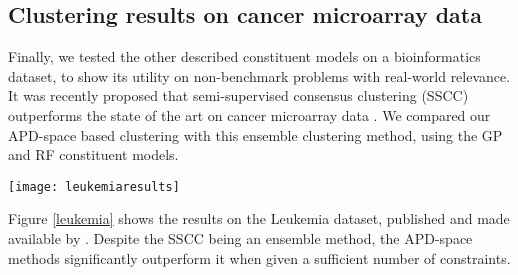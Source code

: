 
\subsection*{Clustering results on cancer microarray data}

Finally, we tested the other described constituent models on a bioinformatics dataset, to show its utility on non-benchmark problems with real-world relevance. It was recently proposed that semi-supervised consensus clustering (SSCC) outperforms the state of the art on cancer microarray data \citep{wang2014semi}. We compared our APD-space based clustering with this ensemble clustering method, using the GP and RF constituent models. 

\begin{figure*}[h]
	\centering
	\texttt{[image: leukemiaresults]}
	
	\caption[Semi-supervised clustering results on cancer microarray data]{\textbf{Semi-supervised clustering results on cancer microarray data} from \citep{golub1999molecular}, compared to the state of the art semi-supervised consensus clustering method by \citep{wang2014semi}.}
	\label{leukemia}
\end{figure*}

Figure \ref{leukemia} shows the results on the Leukemia dataset, published and made available by \citep{golub1999molecular}. Despite the SSCC being an ensemble method, the APD-space methods significantly outperform it when given a sufficient number of constraints.

\renewcommand\bibname{References for Appendix E}

